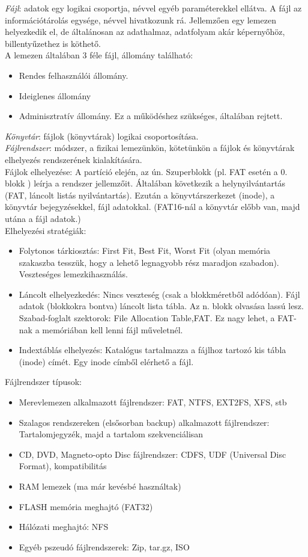\documentclass[margin=0px]{article}
\begin{document}
	\textit{Fájl}: adatok egy logikai csoportja, névvel egyéb paraméterekkel ellátva. A fájl az információtárolás egysége, névvel hivatkozunk rá. Jellemzően egy lemezen helyezkedik el, de általánosan az adathalmaz, adatfolyam akár képernyőhöz, billentyűzethez is köthető. \\
	A lemezen általában 3 féle fájl, állomány található:
	\begin{itemize}
		\item Rendes felhasználói állomány.
		\item Ideiglenes állomány
		\item Adminisztratív állomány. Ez a működéshez szükséges, általában rejtett.
	\end{itemize}
	\textit{Könyvtár}: fájlok (könyvtárak) logikai csoportosítása. \\
	\textit{Fájlrendszer}: módszer, a fizikai lemezünkön, kötetünkön a fájlok és könyvtárak elhelyezés rendszerének kialakítására. \\
	Fájlok elhelyezése: A partíció elején, az ún. Szuperblokk (pl. FAT esetén a 0. blokk ) leírja a rendszer jellemzőit. Általában következik a helynyilvántartás (FAT, láncolt listás nyilvántartás). Ezután a könyvtárszerkezet (inode), a könyvtár bejegyzésekkel, fájl adatokkal. (FAT16-nál a könyvtár előbb van, majd utána a fájl adatok.) \\
	Elhelyezési stratégiák:
	\begin{itemize}
		\item Folytonos tárkiosztás: First Fit, Best Fit, Worst Fit (olyan memória szakaszba tesszük, hogy a lehető legnagyobb rész maradjon szabadon). Veszteséges lemezkihasználás.
		\item Láncolt elhelyezkedés: Nincs veszteség (csak a blokkméretből adódóan). Fájl adatok (blokkokra bontva) láncolt lista tábla. Az n. blokk olvasása lassú lesz. Szabad-foglalt szektorok: File Allocation Table,FAT. Ez nagy lehet, a FAT-nak a memóriában kell lenni fájl műveletnél.
		\item Indextáblás elhelyezés: Katalógus tartalmazza a fájlhoz tartozó kis tábla (inode) címét. Egy inode címből elérhető a fájl.
	\end{itemize}
	
	Fájlrendszer típusok:
	\begin{itemize}
		\item Merevlemezen alkalmazott fájlrendszer: FAT, NTFS, EXT2FS, XFS, stb
		\item Szalagos rendszereken (elsősorban backup) alkalmazott fájlrendszer: Tartalomjegyzék, majd a tartalom szekvenciálisan
		\item CD, DVD, Magneto-opto Disc fájlrendszer: CDFS, UDF (Universal Disc Format), kompatibilitás
		\item RAM lemezek (ma már kevésbé használtak)
		\item FLASH memória meghajtó (FAT32)
		\item Hálózati meghajtó: NFS
		\item Egyéb pszeudó fájlrendszerek: Zip, tar.gz, ISO
	\end{itemize}
	
\end{document}
